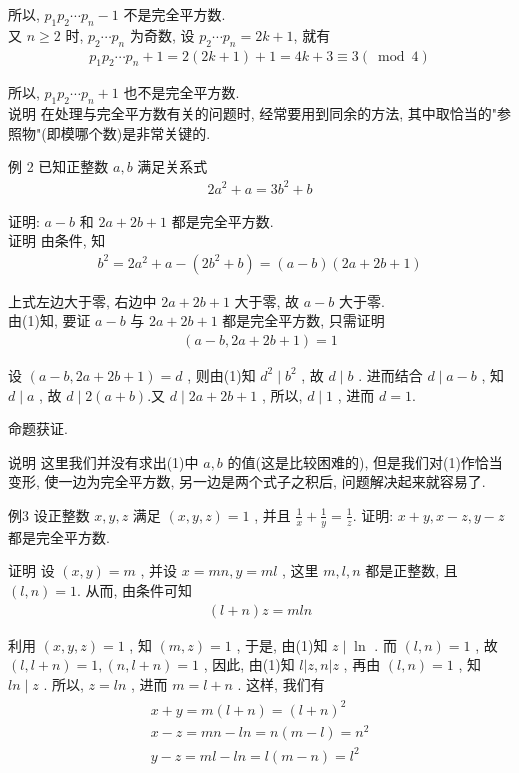 	所以, $p_{1} p_{2} \cdots p_{n}-1$ 不是完全平方数.\\
	又 $n \geqslant 2$ 时, $p_{2} \cdots p_{n}$ 为奇数, 设 $p_{2} \cdots p_{n}=2 k+1$, 就有
	\begin{align*}
		p_{1} p_{2} \cdots p_{n}+1=2(2 k+1)+1=4 k+3 \equiv 3(\bmod 4)
	\end{align*}

	所以, $p_{1} p_{2} \cdots p_{n}+1$ 也不是完全平方数.\\
	说明 在处理与完全平方数有关的问题时, 经常要用到同余的方法, 其中取恰当的"参照物"(即模哪个数)是非常关键的.

	例 2 已知正整数 $a ,  b$ 满足关系式
	\begin{align*}
		2 a^{2}+a=3 b^{2}+b
	\end{align*}

	证明: $a-b$ 和 $2 a+2 b+1$ 都是完全平方数.\\
	证明 由条件, 知
	\begin{align*}
		b^{2}=2 a^{2}+a-\left(2 b^{2}+b\right)=(a-b)(2 a+2 b+1)
	\end{align*}

	上式左边大于零, 右边中 $2 a+2 b+1$ 大于零, 故 $a-b$ 大于零. \\
	由(1)知, 要证 $a-b$ 与 $2 a+2 b+1$ 都是完全平方数, 只需证明
	\begin{align*}
		(a-b, 2 a+2 b+1)=1
	\end{align*}

	设 $(a-b, 2 a+2 b+1)=d$ , 则由(1)知 $d^{2} \mid b^{2}$ , 故 $d \mid b$ . 进而结合 $d \mid a-b$ , 知 $d \mid a$ , 故 $d \mid 2(a+b)$.又 $d \mid 2 a+2 b+1$ , 所以,  $d \mid 1$ , 进而 $d=1$.

	命题获证.

	说明 这里我们并没有求出(1)中 $a ,  b$ 的值(这是比较困难的), 但是我们对(1)作恰当变形, 使一边为完全平方数, 另一边是两个式子之积后, 问题解决起来就容易了.

	例3 设正整数 $x ,  y ,  z$ 满足 $(x, y, z)=1$ , 并且 $\frac{1}{x}+\frac{1}{y}=\frac{1}{z}$. 证明:  $x+y ,  x-z ,  y-z$ 都是完全平方数.

	证明 设 $(x, y)=m$ , 并设 $x=m n, y=m l$ , 这里 $m ,  l ,  n$ 都是正整数, 且 $(l, n)=1$. 从而, 由条件可知
	\begin{align*}
		(l+n) z=m l n
	\end{align*}

	利用 $(x, y, z)=1$ , 知 $(m, z)=1$ , 于是, 由(1)知 $z \mid \ln$ . 而 $(l, n)=1$ , 故 $(l, l+n)=1,(n, l+n)=1$ , 因此, 由(1)知 $l|z, n| z$ , 再由 $(l, n)=1$ , 知 $l n \mid z$ . 所以,  $z=l n$ , 进而 $m=l+n$ . 这样, 我们有
	\begin{align*}
		\begin{gathered}
			x+y=m(l+n)=(l+n)^{2} \\
			x-z=m n-l n=n(m-l)=n^{2} \\
			y-z=m l-l n=l(m-n)=l^{2}
		\end{gathered}
	\end{align*}

